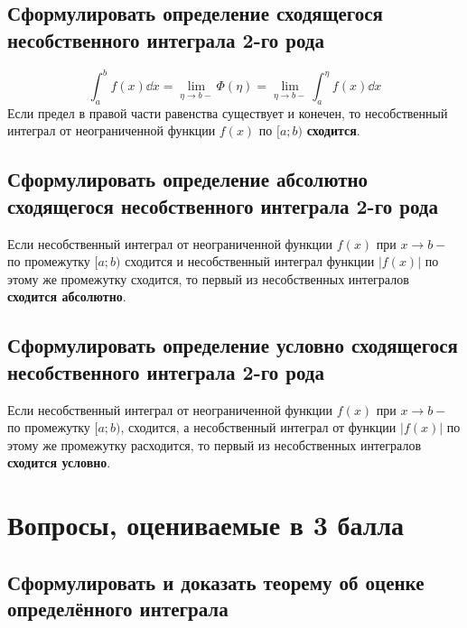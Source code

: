 \subsection{Сформулировать определение сходящегося несобственного интеграла 2-го рода}

\begin{definition}
    \[
        \int_{a}^{b} f(x)\dd{x} = \lim\limits_{\eta \to b-} \Phi (\eta) = \lim\limits_{\eta \to b-} \int_{a}^{\eta} f(x)\dd{x}
    \]
    Если предел в правой части равенства существует и конечен, то несобственный интеграл от неограниченной функции $f(x)$ по $[a;b)$ \textbf{сходится}.
\end{definition}

\subsection{Сформулировать определение абсолютно сходящегося несобственного интеграла 2-го рода}

\begin{definition}
    Если несобственный интеграл от неограниченной функции $f(x)$ при $x \to b-$ по промежутку $[a;b)$ сходится и несобственный интеграл функции $|f(x)|$ по этому же промежутку сходится, то первый из несобственных интегралов \textbf{сходится абсолютно}.
\end{definition}

\subsection{Сформулировать определение условно сходящегося несобственного интеграла 2-го рода}

\begin{definition}
    Если несобственный интеграл от неограниченной функции $f(x)$ при $x\to b-$ по промежутку $[a;b)$, сходится, а несобственный интеграл от функции $|f(x)|$ по этому же промежутку расходится, то первый из несобственных интегралов \textbf{сходится условно}.
\end{definition}

\newpage
\section{Вопросы, оцениваемые в 3 балла}

\subsection{Сформулировать и доказать теорему об оценке определённого интеграла}

